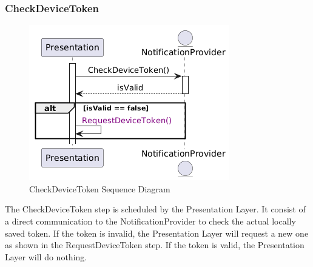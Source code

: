 \subsubsection*{CheckDeviceToken}
\begin{figure}[H]
    \centering
    \includegraphics[width=0.5\linewidth]{Latex/Images/DD/SequenceDiagrams/1.4CheckDeviceToken.png}
    \caption{CheckDeviceToken Sequence Diagram}
    \label{fig:checkdevicetoken}
\end{figure}
The CheckDeviceToken step is scheduled by the Presentation Layer. It consist of a direct communication to the NotificationProvider to check the actual locally saved token. If the token is invalid, the Presentation Layer will request a new one as shown in the RequestDeviceToken step. If the token is valid, the Presentation Layer will do nothing.

